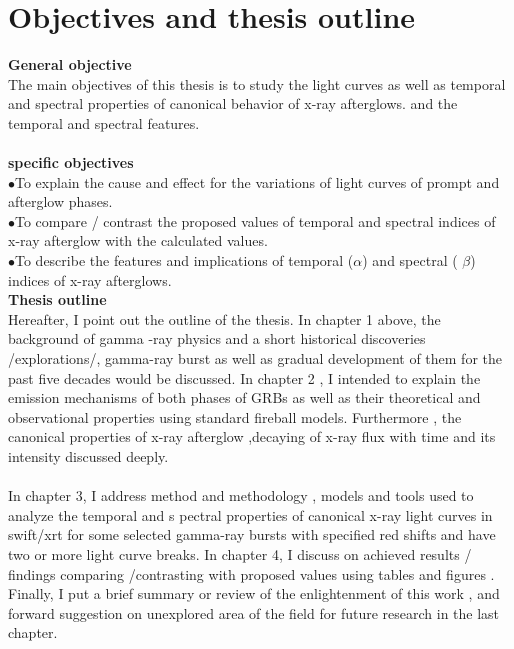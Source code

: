 \section{Objectives and thesis outline}
\textbf{General objective}\\
 The main objectives of this thesis is to study the light curves as well as temporal and spectral properties of canonical behavior of x-ray afterglows. and the  temporal and spectral  features.\\\\    
\textbf{specific objectives}\\
$\bullet$To explain the  cause and effect  for the  variations of light curves of  prompt and afterglow phases.\\
$\bullet$To compare / contrast the proposed values of temporal and spectral  indices of x-ray afterglow with the calculated values.\\
$\bullet$To describe the features and implications of  temporal ($\alpha$) and spectral ( $ \beta $) indices  of x-ray afterglows.\\
\textbf{Thesis outline}\\
 Hereafter, I point out the outline of the thesis. In chapter 1 above, the  background of gamma -ray physics  and a short historical discoveries /explorations/, gamma-ray burst as well as  gradual development of them for the past  five decades would be discussed. In chapter 2 , I intended to explain the emission mechanisms of both phases of GRBs as well as  their  theoretical and observational properties  using standard fireball models. Furthermore , the canonical properties of x-ray afterglow ,decaying  of x-ray flux with time and its intensity discussed deeply. \\\\
In chapter 3, I  address   method and   methodology , models  and  tools  used to analyze  the  temporal  and s pectral  properties  of  canonical x-ray light curves in  swift/xrt  for  some  selected  gamma-ray  bursts  with  specified red  shifts and  have  two  or  more  light  curve breaks.
In chapter 4, I  discuss on achieved results / findings  comparing /contrasting with proposed values  using tables and figures . Finally, I put  a brief summary or review of the enlightenment of this work , and   forward suggestion on unexplored area of the field  for future research in the last chapter. 
